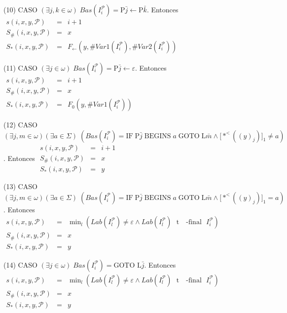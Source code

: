 (10) CASO \((\exists j,k\in \omega )\;Bas(I_{i}^{\mathcal{P}})=\mathrm{ P}\bar{j}\leftarrow \mathrm{P}\bar{k}\). Entonces
\(\displaystyle \begin{array}{rcl} s(i,x,y,\mathcal{P}) & =& i+1 \\ S_{\#}(i,x,y,\mathcal{P}) & =& x \\ S_{\ast }(i,x,y,\mathcal{P}) & =& F_{\leftarrow }(y,\#Var1(I_{i}^{\mathcal{P} }),\#Var2(I_{i}^{\mathcal{P}})) \end{array} \)

(11) CASO \((\exists j\in \omega )\;Bas(I_{i}^{\mathcal{P}})=\mathrm{P} \bar{j}\leftarrow \varepsilon \). Entonces
\(\displaystyle \begin{array}{rcl} s(i,x,y,\mathcal{P}) & =& i+1 \\ S_{\#}(i,x,y,\mathcal{P}) & =& x \\ S_{\ast }(i,x,y,\mathcal{P}) & =& F_{0}(y,\#Var1(I_{i}^{\mathcal{P}})) \end{array} \)

(12) CASO \((\exists j,m\in \omega )(\exists a\in \Sigma )\;\left( Bas(I_{i}^{\mathcal{P}})=\mathrm{IF}\;\mathrm{P}\bar{j}\;\mathrm{BEGINS}\;a\; \mathrm{GOTO}\;\mathrm{L}\bar{m}\wedge \lbrack \ast ^{< }((y)_{j})]_{1}\neq a\right) \). Entonces
\(\displaystyle \begin{array}{rcl} s(i,x,y,\mathcal{P}) & =& i+1 \\ S_{\#}(i,x,y,\mathcal{P}) & =& x \\ S_{\ast }(i,x,y,\mathcal{P}) & =& y \end{array} \)

(13) CASO \((\exists j,m\in \omega )(\exists a\in \Sigma )\;\left( Bas(I_{i}^{\mathcal{P}})=\mathrm{IF\;P}\bar{j}\;\mathrm{BEGINS\;}a\;\mathrm{ GOTO\;L}\bar{m}\wedge \lbrack \ast ^{< }((y)_{j})]_{1}=a\right) \). Entonces
\(\displaystyle \begin{array}{rcl} s(i,x,y,\mathcal{P}) & =& \min_{l}\left( Lab(I_{l}^{\mathcal{P}})\neq \varepsilon \wedge Lab(I_{l}^{\mathcal{P}})\text{ }\mathrm{t}\text{ { -final} }I_{i}^{\mathcal{P}}\right) \\ S_{\#}(i,x,y,\mathcal{P}) & =& x \\ S_{\ast }(i,x,y,\mathcal{P}) & =& y \end{array} \)

(14) CASO \((\exists j\in \omega )\;Bas(I_{i}^{\mathcal{P}})=\mathrm{ GOTO}\) \(\mathrm{L}\bar{j}\). Entonces
\(\displaystyle \begin{array}{rcl} s(i,x,y,\mathcal{P}) & =& \min_{l}\left( Lab(I_{l}^{\mathcal{P}})\neq \varepsilon \wedge Lab(I_{l}^{\mathcal{P}})\text{ }\mathrm{t}\text{ { -final} }I_{i}^{\mathcal{P}}\right) \\ S_{\#}(i,x,y,\mathcal{P}) & =& x \\ S_{\ast }(i,x,y,\mathcal{P}) & =& y \end{array} \)

